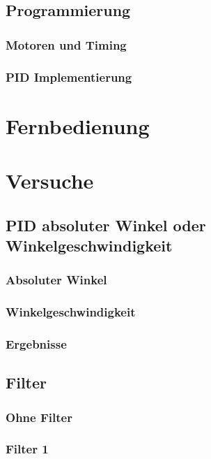 \documentclass[12pt,a4paper, ngerman]{article}
\begin{document}
\subsection{Programmierung}


\subsubsection{Motoren und Timing}

\subsubsection{PID Implementierung}

\section{Fernbedienung}

\section{Versuche}

\subsection{PID absoluter Winkel oder Winkelgeschwindigkeit}

\subsubsection{Absoluter Winkel}

\subsubsection{Winkelgeschwindigkeit}

\subsubsection{Ergebnisse}

\subsection{Filter}

\subsubsection{Ohne Filter}

\subsubsection{Filter 1}
\end{document}

